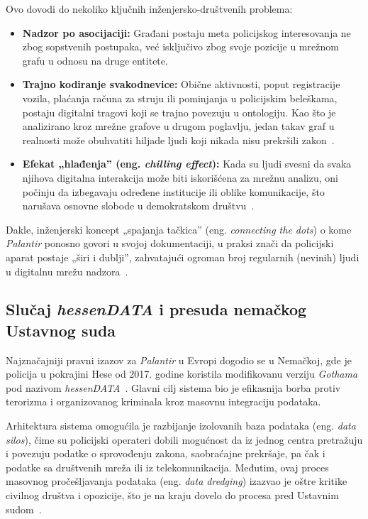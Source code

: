 ﻿\documentclass[12pt]{article}
\begin{document}
Ovo dovodi do nekoliko ključnih inženjersko-društvenih problema:
\begin{itemize}
    \item \textbf{Nadzor po asocijaciji:} Građani postaju meta policijskog interesovanja ne zbog sopstvenih postupaka, već isključivo zbog svoje pozicije u mrežnom grafu u odnosu na druge entitete.
    \item \textbf{Trajno kodiranje svakodnevice:} Obične aktivnosti, poput registracije vozila, plaćanja računa za struju ili pominjanja u policijskim beleškama, postaju digitalni tragovi koji se trajno povezuju u ontologiju.
    Kao što je analizirano kroz mrežne grafove u drugom poglavlju, jedan takav graf u realnosti može obuhvatiti hiljade ljudi koji nikada nisu prekršili zakon~\cite{architecture2024}.
    \item \textbf{Efekat „hlađenja” (eng. \textit{chilling effect}):} Kada su ljudi svesni da svaka njihova digitalna interakcija može biti iskorišćena za mrežnu analizu, oni počinju da izbegavaju određene institucije ili oblike komunikacije, što narušava osnovne slobode u demokratskom društvu~\cite{brayne2017big}.
\end{itemize}

Dakle, inženjerski koncept „spajanja tačkica” (eng. \textit{connecting the dots}) o kome \textit{Palantir} ponosno govori u svojoj dokumentaciji, u praksi znači da policijski aparat postaje „širi i dublji”, zahvatajući ogroman broj regularnih (nevinih) ljudi u digitalnu mrežu nadzora~\cite{palantir2024gotham}.

\subsection{Slučaj \textit{hessenDATA} i presuda nemačkog Ustavnog suda}

Najznačajniji pravni izazov za \textit{Palantir} u Evropi dogodio se u Nemačkoj, gde je policija u pokrajini Hese od 2017. godine koristila modifikovanu verziju \textit{Gothama} pod nazivom \textit{hessenDATA}~\cite{ulbricht2024palantir}.
Glavni cilj sistema bio je efikasnija borba protiv terorizma i organizovanog kriminala kroz masovnu integraciju podataka.

Arhitektura sistema omogućila je razbijanje izolovanih baza podataka (eng. \textit{data silos}), čime su policijski operateri dobili mogućnost da iz jednog centra pretražuju i povezuju podatke o sprovođenju zakona, saobraćajne prekršaje, pa čak i podatke sa društvenih mreža ili iz telekomunikacija.
Međutim, ovaj proces masovnog pročešljavanja podataka (eng. \textit{data dredging}) izazvao je oštre kritike civilnog društva i opozicije, što je na kraju dovelo do procesa pred Ustavnim sudom~\cite{ulbricht2024palantir, architecture2024}.
\end{document}
